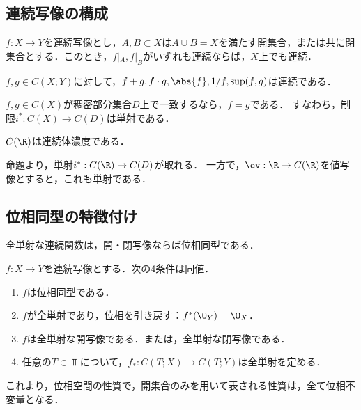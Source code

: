 \documentclass[uplatex,dvipdfmx]{jsreport}
\begin{document}
\subsection{連続写像の構成}

\begin{proposition}
    $f:X\to Y$を連続写像とし，$A,B\subset X$は$A\cup B=X$を満たす開集合，または共に閉集合とする．このとき，$f|_A,f|_B$がいずれも連続ならば，$X$上でも連続．
\end{proposition}

\begin{proposition}
    $f,g\in C(X;Y)$に対して，$f+g,f\cdot g,\abs{f},1/f,\sup(f,g)$は連続である．
\end{proposition}

\begin{proposition}
    $f,g\in C(X)$が稠密部分集合$D$上で一致するなら，$f=g$である．
    すなわち，制限$i^*:C(X)\to C(D)$は単射である．
\end{proposition}

\begin{corollary}
    $C(\R)$は連続体濃度である．
\end{corollary}
\begin{Proof}
    命題より，単射$i^*:C(\R)\to C(D)$が取れる．
    一方で，$\ev:\R\to C(\R)$を値写像とすると，これも単射である．
\end{Proof}

\subsection{位相同型の特徴付け}

\begin{tcolorbox}[colframe=ForestGreen, colback=ForestGreen!10!white,breakable,colbacktitle=ForestGreen!40!white,coltitle=black,fonttitle=\bfseries\sffamily,
title=]
    全単射な連続関数は，開・閉写像ならば位相同型である．
\end{tcolorbox}

\begin{proposition}
    $f:X\to Y$を連続写像とする．次の4条件は同値．
    \begin{enumerate}
        \item $f$は位相同型である．
        \item $f$が全単射であり，位相を引き戻す：$f^*(\O_Y)=\O_X$．
        \item $f$は全単射な開写像である．または，全単射な閉写像である．
        \item 任意の$T\in\Top$について，$f_*:C(T;X)\to C(T;Y)$は全単射を定める．
    \end{enumerate}
\end{proposition}
\begin{remarks}
    これより，位相空間の性質で，開集合のみを用いて表される性質は，全て位相不変量となる．
\end{remarks}
\end{document}
